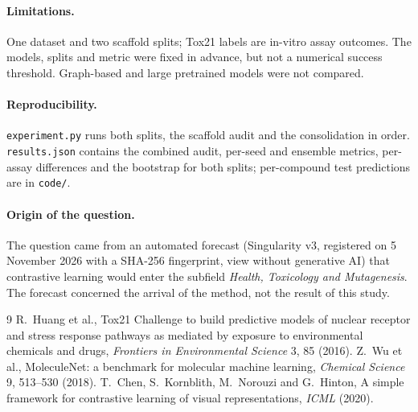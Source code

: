 \documentclass[11pt]{article}
\begin{document}
\paragraph{Limitations.} One dataset and two scaffold splits; Tox21 labels are in-vitro assay outcomes. The models,
splits and metric were fixed in advance, but not a numerical success threshold. Graph-based and large pretrained
models were not compared.

\paragraph{Reproducibility.} \texttt{experiment.py} runs both splits, the scaffold audit and the consolidation in
order. \texttt{results.json} contains the combined audit, per-seed and ensemble metrics, per-assay differences and
the bootstrap for both splits; per-compound test predictions are in \texttt{code/}.

\paragraph{Origin of the question.} The question came from an automated forecast (Singularity v3, registered on 5
November 2026 with a SHA-256 fingerprint, view without generative AI) that contrastive learning would enter the
subfield \emph{Health, Toxicology and Mutagenesis}. The forecast concerned the arrival of the method, not the result
of this study.

\begin{thebibliography}{9}
 R.~Huang et al., Tox21 Challenge to build predictive models of nuclear receptor and stress response
pathways as mediated by exposure to environmental chemicals and drugs, \emph{Frontiers in Environmental Science} 3, 85
(2016).
 Z.~Wu et al., MoleculeNet: a benchmark for molecular machine learning, \emph{Chemical Science}
9, 513--530 (2018).
 T.~Chen, S.~Kornblith, M.~Norouzi and G.~Hinton, A simple framework for contrastive learning of
visual representations, \emph{ICML} (2020).
\end{thebibliography}
\end{document}
